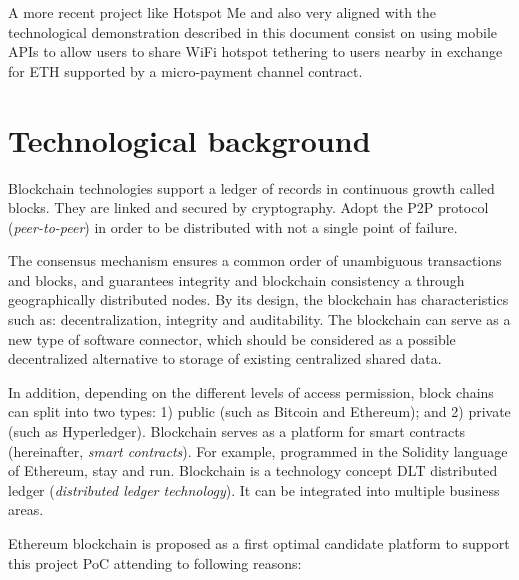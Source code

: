 \documentclass[12pt]{amsart}
\begin{document}
\begin{multicols}{2}
\vspace{0.35cm}

A more recent project like Hotspot Me\cite{hotspotme}
and also very aligned with the technological demonstration
described in this document consist on using mobile
APIs to allow users to share WiFi hotspot tethering
to users nearby in exchange for ETH supported by a
micro-payment channel contract.


\section{Technological background}\label{ch:bc}

\vspace{0.35cm}

Blockchain technologies support a ledger of records in
continuous growth called blocks.
They are linked and secured by
cryptography. Adopt the P2P protocol
(\textit{peer-to-peer}) in order to be distributed
with not a single point of failure.

\vspace{0.35cm}

The consensus mechanism ensures a common order
of unambiguous transactions and
blocks, and guarantees integrity and
blockchain consistency a
through geographically distributed nodes.
By its design, the blockchain has characteristics
such as: decentralization, integrity and auditability.
The blockchain can serve as a new
type of software connector, which should be considered
as a possible decentralized alternative to storage
of existing centralized shared data.

\vspace{0.35cm}

In addition, depending on the different levels of
access permission, block chains can
split into two types:
1) public (such as Bitcoin and Ethereum); and
2) private (such as Hyperledger). Blockchain serves
as a platform for smart contracts
(hereinafter, \textit{smart contracts}).
For example, programmed in the Solidity language of
Ethereum, stay and run.
Blockchain is a technology concept
DLT distributed ledger
(\textit{distributed ledger technology}).
It can be integrated into multiple business areas.

\vspace{0.35cm}

Ethereum
blockchain is proposed as a first optimal candidate platform
to support this project PoC attending to
following reasons:


\end{multicols}
\end{document}
